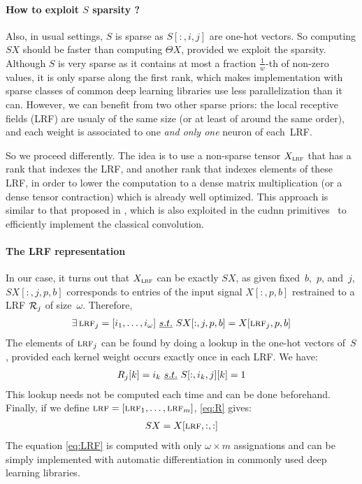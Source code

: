 \paragraph{How to exploit $S$ sparsity ?}
Also, in usual settings, $S$ is sparse as $S[:,i,j]$ are one-hot vectors. So computing $SX$ should be faster than computing $\Theta X$, provided we exploit the sparsity. Although $S$ is very sparse as it contains at most a fraction $\frac{1}{w}$-th of non-zero values, it is only sparse along the first rank, which makes implementation with sparse classes of common deep learning libraries use less parallelization than it can. However, we can benefit from two other sparse priors: the local receptive fields (LRF) are usualy of the same size (or at least of around the same order), and each weight is associated to one \emph{and only one} neuron of each~LRF.

So we proceed differently. The idea is to use a non-sparse tensor $X_{\operatorname{\textsc{lrf}}}$ that has a rank that indexes the LRF, and another rank that indexes elements of these LRF, in order to lower the computation to a dense matrix multiplication (or a dense tensor contraction) which is already well optimized. This approach is similar to that proposed in \cite{chellapilla2006high}, which is also exploited in the cudnn primitives~\citep{chetlur2014cudnn} to efficiently implement the classical convolution.

\paragraph{The LRF representation}
In our case, it turns out that $X_{\operatorname{\textsc{lrf}}}$ can be exactly $SX$, as given fixed~$b$,~$p$, and~$j$, $SX[:,j,p,b]$ corresponds to entries of the input signal $X[:,p,b]$ restrained to a LRF $\mathcal{R}_j$ of size~$\omega$. Therefore,
\begin{gather}
\exists \operatorname{\textsc{lrf}}_j = [i_1, \ldots, i_\omega]~\emph{s.t.}~ SX[:,j,p,b] = X[\operatorname{\textsc{lrf}}_j, p, b]
\label{eq:R}
\end{gather}
The elements of $\operatorname{\textsc{lrf}}_j$ can be found by doing a lookup in the one-hot vectors of~$S$, provided each kernel weight occurs exactly once in each LRF. We have:
\begin{gather}
R_j[k] = i_k~\emph{s.t.}~ S[:,i_k,j][k] = 1
\end{gather}
This lookup needs not be computed each time and can be done beforehand. Finally, if we define $\operatorname{\textsc{lrf}} = [\operatorname{\textsc{lrf}}_1, \ldots, \operatorname{\textsc{lrf}}_m]$, \eqref{eq:R} gives:
\begin{gather}
SX = X[\operatorname{\textsc{lrf}}, :, :]
\label{eq:LRF}
\end{gather}
The equation \eqref{eq:LRF} is computed with only $\omega \times m$ assignations and can be simply implemented with automatic differentiation in commonly used deep learning libraries.

